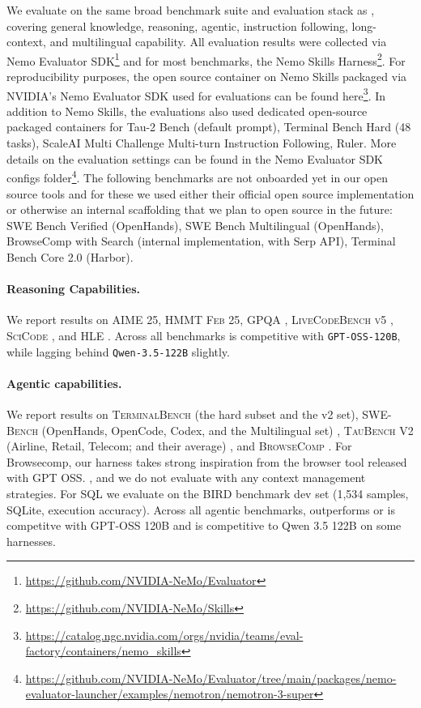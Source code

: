 We evaluate \ourmodel on the same broad benchmark suite and evaluation stack as \nanomodel\citep{nvidia2025nemotron3nanoopen}, covering general knowledge, reasoning, agentic, instruction following, long-context, and multilingual capability. All evaluation results were collected via Nemo Evaluator SDK\footnote{\url{https://github.com/NVIDIA-NeMo/Evaluator}} and for most benchmarks, the Nemo Skills Harness\footnote{\url{https://github.com/NVIDIA-NeMo/Skills}}. For reproducibility purposes, the open source container on Nemo Skills packaged via NVIDIA's Nemo Evaluator SDK used for evaluations can be found here\footnote{\url{https://catalog.ngc.nvidia.com/orgs/nvidia/teams/eval-factory/containers/nemo_skills}}. In addition to Nemo Skills, the evaluations also used dedicated open-source packaged containers for Tau-2 Bench (default prompt), Terminal Bench Hard (48 tasks), ScaleAI Multi Challenge Multi-turn Instruction Following, Ruler. More details on the evaluation settings can be found in the Nemo Evaluator SDK configs folder\footnote{\url{https://github.com/NVIDIA-NeMo/Evaluator/tree/main/packages/nemo-evaluator-launcher/examples/nemotron/nemotron-3-super}}. The following benchmarks are not onboarded yet in our open source tools and for these we used either their official open source implementation or otherwise an internal scaffolding that we plan to open source in the future: SWE Bench Verified (OpenHands), SWE Bench Multilingual (OpenHands), BrowseComp with Search (internal implementation, with Serp API), Terminal Bench Core 2.0 (Harbor).

\paragraph{Reasoning Capabilities.}
We report results on \textsc{AIME 25}, \textsc{HMMT Feb 25}, \textsc{GPQA} \citep{rein2023gpqa}, \textsc{LiveCodeBench v5} \citep{jain2024livecodebench}, \textsc{SciCode} \citep{tian2024scicoderesearchcodingbenchmark}, and \textsc{HLE} \citep{phan2025humanitysexam}. Across all benchmarks \ourmodel is competitive with \texttt{GPT-OSS-120B}, while lagging behind \texttt{Qwen-3.5-122B} slightly.

\paragraph{Agentic capabilities.}
 We report results on \textsc{TerminalBench} (the hard subset and the v2 set),
\textsc{SWE-Bench} (OpenHands, OpenCode, Codex, and the Multilingual set) \citep{jimenez2023swe}, \textsc{TauBench V2} (Airline, Retail, Telecom; and their average) \citep{barres2025tau},
and \textsc{BrowseComp} \citep{wei2025browsecomp}. For Browsecomp, our harness takes strong inspiration from the browser tool released with GPT OSS. \citep{openai2025gptoss120bgptoss20bmodel}, and we do not evaluate with any context management strategies. For SQL we evaluate on the BIRD benchmark \cite{li2023bird} dev set (1,534 samples, SQLite, execution accuracy). Across all agentic benchmarks, \ourmodel outperforms or is competitve with GPT-OSS 120B and is competitive to Qwen 3.5 122B on some harnesses. 

